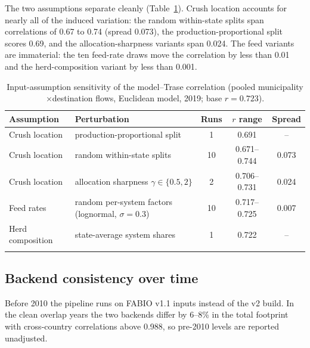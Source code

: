 \documentclass[pdflatex,sn-nature]{sn-jnl}%
\begin{document}
The two assumptions separate cleanly (Table~\ref{tab:val-inputs}).
Crush location accounts for nearly all of the induced variation: the
random within-state splits span correlations of 0.67 to 0.74 (spread
0.073), the production-proportional split scores 0.69, and the
allocation-sharpness variants span 0.024. The feed variants are
immaterial: the ten feed-rate draws move the correlation by less than
0.01 and the herd-composition variant by less than 0.001.

\begin{table}[htbp]
\caption{Input-assumption sensitivity of the model--Trase correlation
(pooled municipality$\times$destination flows, Euclidean model, 2019;
base $r=0.723$).}\label{tab:val-inputs}
\begin{tabular}{@{}llccc@{}}
\toprule
Assumption & Perturbation & Runs & $r$ range & Spread \\
\midrule
Crush location & production-proportional split & 1 & 0.691 & -- \\
Crush location & random within-state splits & 10 & 0.671--0.744 & 0.073 \\
Crush location & allocation sharpness $\gamma\in\{0.5,2\}$ & 2 & 0.706--0.731 & 0.024 \\
Feed rates & random per-system factors (lognormal, $\sigma=0.3$) & 10 & 0.717--0.725 & 0.007 \\
Herd composition & state-average system shares & 1 & 0.722 & -- \\
\botrule
\end{tabular}
\end{table}

\subsection{Backend consistency over time}\label{subsec:val-backend}
Before 2010 the pipeline runs on FABIO v1.1 inputs instead of the v2
build. In the clean overlap years the two backends differ by 6--8\% in
the total footprint with cross-country correlations above 0.988, so
pre-2010 levels are reported unadjusted.
\end{document}
